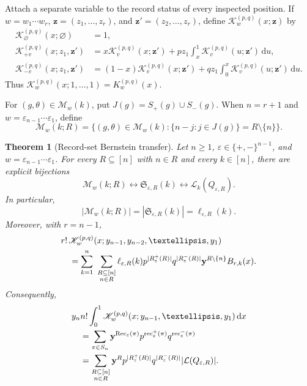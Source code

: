 \documentclass[10pt,a4paper]{amsart}
\newtheorem{theorem}{Theorem}[section]
\DeclareMathOperator{\rec}{rec}
\newcommand{\dd}{\,\mathrm{d}}
\newcommand{\eps}{\varepsilon}
\begin{document}
Attach a separate variable to the record status of every inspected position.
If \(w=w_1\cdots w_r\), \(\mathbf z=(z_1,\ldots,z_r)\), and
\(\mathbf z'=(z_2,\ldots,z_r)\), define
\(\mathscr K_w^{(p,q)}(x;\mathbf z)\) by
\begin{align*}
\mathscr K_\varnothing^{(p,q)}(x;\varnothing)&=1,\\
\mathscr K_{+v}^{(p,q)}(x;z_1,\mathbf z')
 &=x\mathscr K_v^{(p,q)}(x;\mathbf z')
   +p z_1\int_x^1\mathscr K_v^{(p,q)}(u;\mathbf z')\dd u,\\
\mathscr K_{-v}^{(p,q)}(x;z_1,\mathbf z')
 &=(1-x)\mathscr K_v^{(p,q)}(x;\mathbf z')
   +q z_1\int_0^x\mathscr K_v^{(p,q)}(u;\mathbf z')\dd u.
\end{align*}
Thus \(\mathscr K_w^{(p,q)}(x;1,\ldots,1)=K_w^{(p,q)}(x)\).

For \((g,\theta)\in\mathcal M_w(k)\), put
\(J(g)=S_+(g)\cup S_-(g)\).  When \(n=r+1\) and
\(w=\eps_{n-1}\cdots\eps_1\), define
\[
\mathcal M_w(k;R)
 =\bigl\{(g,\theta)\in\mathcal M_w(k):
          \{n-j:j\in J(g)\}=R\setminus\{n\}\bigr\}.
\]


\begin{theorem}[Record-set Bernstein transfer]
\label{thm:record-set-master-transfer}
Let \(n\ge1\), \(\eps\in\{+,-\}^{n-1}\), and
\(w=\eps_{n-1}\cdots\eps_1\).  For every \(R\subseteq[n]\) with \(n\in R\)
and every \(k\in[n]\), there are explicit bijections
\[
\mathcal M_w(k;R)
 \longleftrightarrow \mathfrak S_{\eps,R}(k)
 \longleftrightarrow \mathcal L_k(Q_{\eps,R}).
\]
In particular,
\[
|\mathcal M_w(k;R)|
 =|\mathfrak S_{\eps,R}(k)|
 =\ell_{\eps,R}(k).
\]
Moreover, with \(r=n-1\),
\begin{align}
&r!\,\mathscr K_w^{(p,q)}
  (x;y_{n-1},y_{n-2},\ldots,y_1) \notag\\
&\quad=
\sum_{k=1}^{n}\ \sum_{\substack{R\subseteq[n]\\n\in R}}
 \ell_{\eps,R}(k)
 p^{|R_\eps^+(R)|}q^{|R_\eps^-(R)|}
 \mathbf y^{R\setminus\{n\}}B_{r,k}(x).
\label{eq:record-set-master-bernstein}
\end{align}
Consequently,
\begin{align}
&y_n n!\int_0^1
 \mathscr K_w^{(p,q)}(x;y_{n-1},\ldots,y_1)\dd x \notag\\
&\quad=
\sum_{\pi\in S_n}
 \mathbf y^{\operatorname{Rec}_\eps(\pi)}
 p^{\rec_\eps^+(\pi)}q^{\rec_\eps^-(\pi)} \notag\\
&\quad=
\sum_{\substack{R\subseteq[n]\\n\in R}}
 \mathbf y^R p^{|R_\eps^+(R)|}q^{|R_\eps^-(R)|}
 |\mathcal L(Q_{\eps,R})|.
\label{eq:record-set-master-integrated}
\end{align}
\end{theorem}
\end{document}
